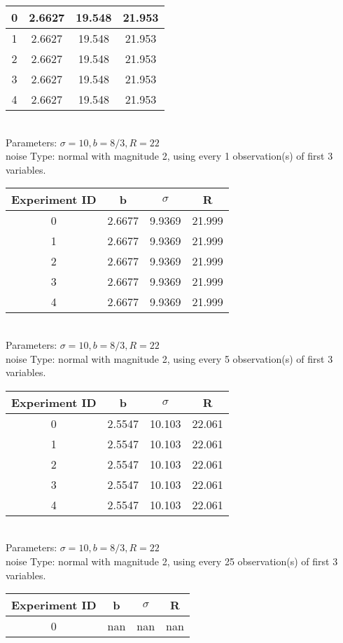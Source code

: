 \begin{multicols}{3}
\begin{tabular}{cccc}
0 & 2.6627 & 19.548 & 21.953\\ \hline 
 1 & 2.6627 & 19.548 & 21.953\\ \hline 
 2 & 2.6627 & 19.548 & 21.953\\ \hline 
 3 & 2.6627 & 19.548 & 21.953\\ \hline 
 4 & 2.6627 & 19.548 & 21.953\\ \hline 
 \end{tabular}\\
Parameters: $\sigma=10, b=8/3, R=22$\\
noise Type: normal with magnitude 2, using every 1 observation(s) of first 3 variables.\\
\begin{tabular}{cccc}
\hline Experiment ID & b & $\sigma$ & R \\ \hline 
0 & 2.6677 & 9.9369 & 21.999\\ \hline 
 1 & 2.6677 & 9.9369 & 21.999\\ \hline 
 2 & 2.6677 & 9.9369 & 21.999\\ \hline 
 3 & 2.6677 & 9.9369 & 21.999\\ \hline 
 4 & 2.6677 & 9.9369 & 21.999\\ \hline 
 \end{tabular}\\
Parameters: $\sigma=10, b=8/3, R=22$\\
noise Type: normal with magnitude 2, using every 5 observation(s) of first 3 variables.\\
\begin{tabular}{cccc}
\hline Experiment ID & b & $\sigma$ & R \\ \hline 
0 & 2.5547 & 10.103 & 22.061\\ \hline 
 1 & 2.5547 & 10.103 & 22.061\\ \hline 
 2 & 2.5547 & 10.103 & 22.061\\ \hline 
 3 & 2.5547 & 10.103 & 22.061\\ \hline 
 4 & 2.5547 & 10.103 & 22.061\\ \hline 
 \end{tabular}\\
Parameters: $\sigma=10, b=8/3, R=22$\\
noise Type: normal with magnitude 2, using every 25 observation(s) of first 3 variables.\\
\begin{tabular}{cccc}
\hline Experiment ID & b & $\sigma$ & R \\ \hline 
0 & nan & nan & nan\\ \hline 

\end{tabular}
\end{multicols}
